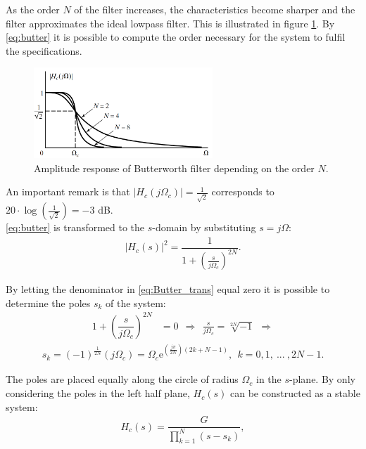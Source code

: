 As the order $N$ of the filter increases, the characteristics become sharper and the filter approximates the ideal lowpass filter. This is illustrated in figure \ref{fig:butter}. By \eqref{eq:butter} it is possible to compute the order necessary for the system to fulfil the specifications.            
\begin{figure}[H]
    \centering
    \includegraphics[width = 0.6\textwidth]{figures/butterworth.png}
    \caption{Amplitude response of Butterworth filter depending on the order $N$.}
    \label{fig:butter}
\end{figure}

An important remark is that $|H_c(j\Omega_c)| = \frac{1}{\sqrt{2}}$ corresponds to $20\cdot \log\left(\frac{1}{\sqrt{2}}\right) = -3$ dB. \\
\eqref{eq:butter} is transformed to the $s$-domain by substituting $s = j\Omega$:
\begin{align} \label{eq:Butter_trans}
|H_c(s)|^2 = \dfrac{1}{1+\left( \frac{s}{j\Omega_c}\right)^{2N}}.
\end{align}

By letting the denominator in \eqref{eq:Butter_trans} equal zero it is possible to determine the poles $s_k$ of the system:
\begin{align*}
1+\left( \dfrac{s}{j\Omega_c}\right)^{2N} &= 0 \ \  \Rightarrow  \ \ \frac{s}{j \Omega_c} = \sqrt[2N]{-1} \ \ \Rightarrow 
\end{align*}
\begin{align*}
s_k = (-1)^{\frac{1}{2N}} \left( j\Omega_c \right) = \Omega_c\text{e}^{ \left( \frac{j\pi}{2N} \right) \left( 2k+ N-1 \right) }, \ \ k=0,1,\ ... \ , 2N-1.
\end{align*}

The poles are placed equally along the circle of radius $\Omega_c$ in the $s$-plane. By only considering the poles in the left half plane, $H_c(s)$ can be constructed as a stable system:
\begin{align*}
H_c(s)=\dfrac{G}{\prod_{k=1}^{N}(s-s_k)},
\end{align*}

